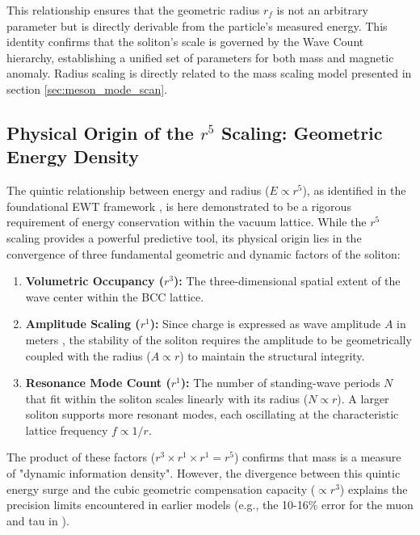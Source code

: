 \documentclass[10pt,a4paper]{article}
\begin{document}
This relationship ensures that the geometric radius $r_f$ is not an arbitrary parameter but is directly derivable from the particle's measured energy. This identity confirms that the soliton's scale is governed by the Wave Count hierarchy, establishing a unified set of parameters for both mass and magnetic anomaly. Radius scaling is directly related to the mass scaling model presented in section \ref{sec:meson_mode_scan}.

\subsection{Physical Origin of the $r^5$ Scaling: Geometric Energy Density}
\label{sec:quintic_origin}

The quintic relationship between energy and radius ($E \propto r^5$), as identified in the foundational EWT framework \cite{yee2014leptons, yee2019masscharge}, is here demonstrated to be a rigorous requirement of energy conservation within the vacuum lattice. While the $r^5$ scaling provides a powerful predictive tool, its physical origin lies in the convergence of three fundamental geometric and dynamic factors of the soliton:

\begin{enumerate}
	\item \textbf{Volumetric Occupancy ($r^3$):} The three-dimensional spatial extent of the wave center within the BCC lattice.
	\item \textbf{Amplitude Scaling ($r^1$):} Since charge is expressed as wave amplitude $A$ in meters \cite{yee2019masscharge}, the stability of the soliton requires the amplitude to be geometrically coupled with the radius ($A \propto r$) to maintain the structural integrity.
	\item \textbf{Resonance Mode Count ($r^1$):} The number of standing-wave 
	periods $N$ that fit within the soliton scales linearly with its radius 
	($N \propto r$). A larger soliton supports more resonant modes, each 
	oscillating at the characteristic lattice frequency $f \propto 1/r$.
\end{enumerate}



The product of these factors ($r^3 \times r^1 \times r^1 = r^5$) confirms that mass is a measure of "dynamic information density". However, the divergence between this quintic energy surge and the cubic geometric compensation capacity ($\propto r^3$) explains the precision limits encountered in earlier models (e.g., the 10-16\% error for the muon and tau in \cite{yee2014leptons}). 
\end{document}
